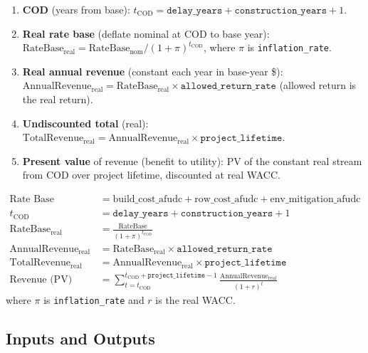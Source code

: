 \documentclass[ctcc_full_documentation.tex]{subfiles}
\begin{document}
\begin{enumerate}
    \item \textbf{COD} (years from base): $t_{\mathrm{COD}} = \texttt{delay\_years} + \texttt{construction\_years} + 1$.
    \item \textbf{Real rate base} (deflate nominal at COD to base year): $\mathrm{RateBase}_{\mathrm{real}} = \mathrm{RateBase}_{\mathrm{nom}} / (1+\pi)^{t_{\mathrm{COD}}}$, where $\pi$ is \texttt{inflation\_rate}.
    \item \textbf{Real annual revenue} (constant each year in base-year \$): $\mathrm{AnnualRevenue}_{\mathrm{real}} = \mathrm{RateBase}_{\mathrm{real}} \times \texttt{allowed\_return\_rate}$ (allowed return is the real return).
    \item \textbf{Undiscounted total} (real): $\mathrm{TotalRevenue}_{\mathrm{real}} = \mathrm{AnnualRevenue}_{\mathrm{real}} \times \texttt{project\_lifetime}$.
    \item \textbf{Present value} of revenue (benefit to utility): PV of the constant real stream from COD over project lifetime, discounted at real WACC.
\end{enumerate}

\begin{align}
\text{Rate Base (nominal at COD)} &= \text{build\_cost\_afudc} + \text{row\_cost\_afudc} + \text{env\_mitigation\_afudc} \\
t_{\mathrm{COD}} &= \texttt{delay\_years} + \texttt{construction\_years} + 1 \\
\mathrm{RateBase}_{\mathrm{real}} &= \frac{\mathrm{Rate Base}}{(1+\pi)^{t_{\mathrm{COD}}}} \\
\mathrm{AnnualRevenue}_{\mathrm{real}} &= \mathrm{RateBase}_{\mathrm{real}} \times \texttt{allowed\_return\_rate} \\
\mathrm{TotalRevenue}_{\mathrm{real}} &= \mathrm{AnnualRevenue}_{\mathrm{real}} \times \texttt{project\_lifetime} \\
\text{Revenue (PV)} &= \sum_{t=t_{\mathrm{COD}}}^{t_{\mathrm{COD}}+\texttt{project\_lifetime}-1} \frac{\mathrm{AnnualRevenue}_{\mathrm{real}}}{(1 + r)^t}
\end{align}
where $\pi$ is \texttt{inflation\_rate} and $r$ is the real WACC.

\subsection{Inputs and Outputs}
\end{document}
